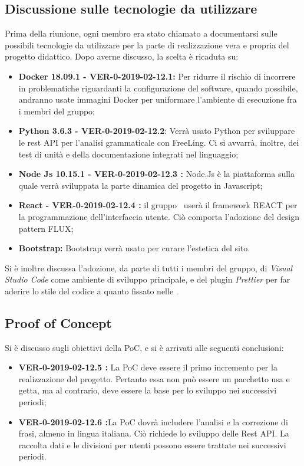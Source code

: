 \documentclass[a4paper, oneside, openany, dvipsnames, table]{article}
\begin{document}
\subsection{Discussione sulle tecnologie da utilizzare}
Prima della riunione, ogni membro era stato chiamato a documentarsi sulle possibili tecnologie da utilizzare per la parte di realizzazione vera e propria del progetto didattico. Dopo averne discusso, la scelta è ricaduta su:
\begin{itemize}
	\item \textbf{Docker 18.09.1 - VER-0-2019-02-12.1:} Per ridurre il rischio di incorrere in problematiche riguardanti la configurazione del software, quando possibile, andranno usate immagini Docker per uniformare l'ambiente di esecuzione fra i membri del gruppo;
	\item \textbf{Python 3.6.3 - VER-0-2019-02-12.2}: Verrà usato Python per sviluppare le rest API per l'analisi grammaticale con FreeLing. Ci si avvarrà, inoltre, dei test di unità e della documentazione integrati nel linguaggio;
	\item \textbf{Node Js 10.15.1 - VER-0-2019-02-12.3 :} Node.Js è la piattaforma sulla quale verrà sviluppata la parte dinamica del progetto in Javascript;
	\item \textbf{React - VER-0-2019-02-12.4 :} il gruppo \gruppo \ userà il framework REACT per la programmazione dell'interfaccia utente. Ciò comporta l'adozione del design pattern FLUX;
	\item \textbf{Bootstrap:} Bootstrap verrà usato per curare l'estetica del sito.
\end{itemize}

Si è inoltre discussa l'adozione, da parte di tutti i membri del gruppo, di \textit{Visual Studio Code} come ambiente di sviluppo principale, e del plugin \textit{Prettier} per far aderire lo stile del codice a quanto fissato nelle \NdP .

\subsection{Proof of Concept}
Si è discusso sugli obiettivi della PoC, e si è arrivati alle seguenti conclusioni:
\begin{itemize}
	\item  \textbf{VER-0-2019-02-12.5 :} La PoC deve essere il primo incremento per la realizzazione del progetto. Pertanto essa non può essere un pacchetto usa e getta, ma al contrario, deve essere la base per lo sviluppo nei successivi periodi;
	\item  \textbf{VER-0-2019-02-12.6 :}La PoC dovrà includere l'analisi e la correzione di frasi, almeno in lingua italiana. Ciò richiede lo sviluppo delle Rest API. La raccolta dati e le divisioni per utenti possono essere trattate nei successivi periodi.
\end{itemize}
	
\end{document}
